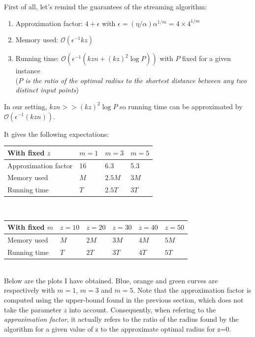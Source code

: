 \documentclass[a4paper]{article}%
\begin{document}
	First of all, let's remind the guarantees of the streaming algorithm:
	\begin{enumerate}
		\item Approximation factor: $4+\epsilon$ with $\epsilon=(\eta/\alpha)\alpha^{1/m}=4\times4^{1/m}$
		\item Memory used: $\mathcal{O}(\epsilon^{-1}kz)$
		\item Running time: $\mathcal{O}(\epsilon^{-1}(kzn + (kz)^2\log P))$ with $P$ fixed for a given instance\\
		(\textit{$P$ is the ratio of the optimal radius to the shortest distance between any two distinct input points})
	\end{enumerate}

	In our setting, $kzn >> (kz)^2\log P$ so running time can be approximated by $\mathcal{O}(\epsilon^{-1}(kzn))$.

	It gives the following expectations:\\

	\begin{tabular}{|l|l|l|l|}
		\hline
		With fixed $z$ & $m=1$ & $m=3$ & $m=5$ \\
		\hline
		Approximation factor & 16 & 6.3 & 5.3 \\
		Memory used & $M$ & $2.5M$ & $3M$ \\
		Running time & $T$ & $2.5T$ & $3T$ \\
		\hline
	 \end{tabular}\\

	\begin{tabular}{|l|l|l|l|l|l|}
		\hline
		With fixed $m$ & $z=10$ & $z=20$ & $z=30$ & $z=40$ & $z=50$ \\
		\hline
		Memory used & $M$ & $2M$ & $3M$ & $4M$ & $5M$ \\
		Running time & $T$ & $2T$ & $3T$ & $4T$ & $5T$ \\
		\hline
	 \end{tabular}\\

	Below are the plots I have obtained. Blue, orange and green curves are respectively with $m=1$, $m=3$ and $m=5$.
	Note that the approximation factor is computed using the upper-bound found in the previous section, which does not
	take the parameter $z$ into account. Consequently, when refering to the \textit{approximation factor},
	it actually refers to the ratio of the radius found by the algorithm for a given value of z to the approximate
	optimal radius for z=0.
\end{document}
